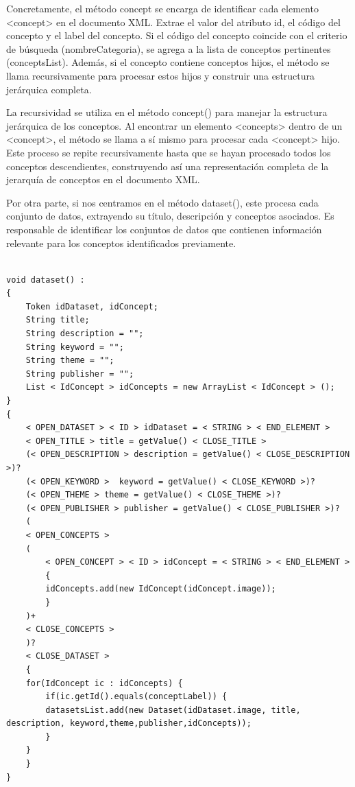 Concretamente, el método concept se encarga de identificar cada elemento <concept> en el documento XML. Extrae el valor del atributo id, el código del concepto y el label del concepto. Si el código del concepto coincide con el criterio de búsqueda (nombreCategoria), se agrega a la lista de conceptos pertinentes (conceptsList). Además, si el concepto contiene conceptos hijos, el método se llama recursivamente para procesar estos hijos y construir una estructura jerárquica completa.

La recursividad se utiliza en el método concept() para manejar la estructura jerárquica de los conceptos. Al encontrar un elemento <concepts> dentro de un <concept>, el método se llama a sí mismo para procesar cada <concept> hijo. Este proceso se repite recursivamente hasta que se hayan procesado todos los conceptos descendientes, construyendo así una representación completa de la jerarquía de conceptos en el documento XML.

Por otra parte, si nos centramos en el método dataset(), este  procesa cada conjunto de datos, extrayendo su título, descripción y conceptos asociados. Es responsable de identificar los conjuntos de datos que contienen información relevante para los conceptos identificados previamente.

\lstset{inputencoding=utf8/latin1}
\begin{lstlisting}
    
void dataset() :
{
    Token idDataset, idConcept;
    String title;
    String description = "";
    String keyword = "";
    String theme = "";
    String publisher = "";
    List < IdConcept > idConcepts = new ArrayList < IdConcept > ();
} 
{
    < OPEN_DATASET > < ID > idDataset = < STRING > < END_ELEMENT > 
    < OPEN_TITLE > title = getValue() < CLOSE_TITLE > 
    (< OPEN_DESCRIPTION > description = getValue() < CLOSE_DESCRIPTION >)?
    (< OPEN_KEYWORD >  keyword = getValue() < CLOSE_KEYWORD >)?
    (< OPEN_THEME > theme = getValue() < CLOSE_THEME >)?
    (< OPEN_PUBLISHER > publisher = getValue() < CLOSE_PUBLISHER >)?
    (
    < OPEN_CONCEPTS >
    (
        < OPEN_CONCEPT > < ID > idConcept = < STRING > < END_ELEMENT >
        {
        idConcepts.add(new IdConcept(idConcept.image));
        }
    )+
    < CLOSE_CONCEPTS >
    )?
    < CLOSE_DATASET >
    {
    for(IdConcept ic : idConcepts) {
        if(ic.getId().equals(conceptLabel)) {
        datasetsList.add(new Dataset(idDataset.image, title, description, keyword,theme,publisher,idConcepts));
        }
    }
    }
}   

\end{lstlisting}

